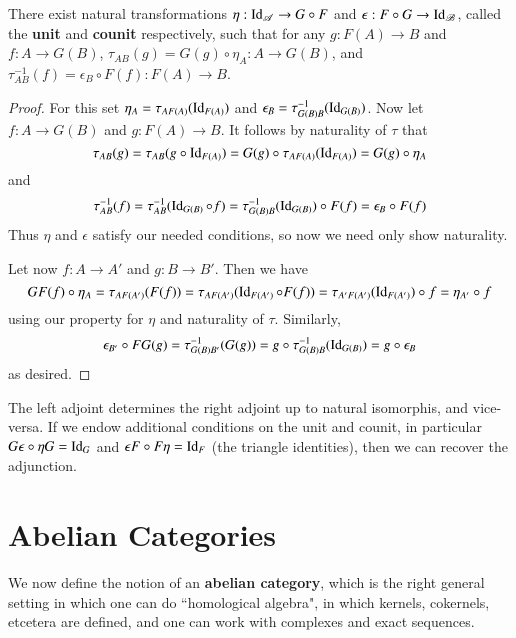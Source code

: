 \begin{proposition}
    There exist natural transformations $\eta:\operatorname{Id}_{\mathscr{A}}\rightarrow G\circ F$ and $\epsilon:F\circ G\rightarrow \operatorname{Id}_{\mathscr{B}}$, called the \textbf{unit} and \textbf{counit} respectively, such that for any $g:F(A)\rightarrow B$ and $f:A\rightarrow G(B)$, $\tau_{AB}(g) = G(g)\circ \eta_A:A\rightarrow G(B)$, and $\tau_{AB}^{-1}(f) = \epsilon_B\circ F(f):F(A)\rightarrow B$.
\end{proposition}
\begin{proof}
    For this set $\eta_A = \tau_{AF(A)}(\operatorname{Id}_{F(A)})$ and $\epsilon_B = \tau_{G(B)B}^{-1}(\operatorname{Id}_{G(B)})$. Now let $f:A\rightarrow G(B)$ and $g:F(A)\rightarrow B$. It follows by naturality of $\tau$ that \begin{equation*}
        \tau_{AB}(g) = \tau_{AB}(g\circ \operatorname{Id}_{F(A)}) = G(g)\circ\tau_{AF(A)}(\operatorname{Id}_{F(A)}) = G(g)\circ \eta_A
    \end{equation*}
    and \begin{equation*}
        \tau_{AB}^{-1}(f) = \tau_{AB}^{-1}(\operatorname{Id}_{G(B)}\circ f) = \tau^{-1}_{G(B)B}(\operatorname{Id}_{G(B)})\circ F(f) = \epsilon_B\circ F(f)
    \end{equation*}
    Thus $\eta$ and $\epsilon$ satisfy our needed conditions, so now we need only show naturality.

    Let now $f:A\rightarrow A'$ and $g:B\rightarrow B'$. Then we have $$GF(f)\circ \eta_A = \tau_{AF(A')}(F(f)) = \tau_{AF(A')}(\operatorname{Id}_{F(A')}\circ F(f)) = \tau_{A'F(A')}(\operatorname{Id}_{F(A')})\circ f = \eta_{A'}\circ f$$
    using our property for $\eta$ and naturality of $\tau$. Similarly, $$\epsilon_{B'}\circ FG(g) = \tau_{G(B)B'}^{-1}(G(g)) = g\circ \tau^{-1}_{G(B)B}(\operatorname{Id}_{G(B)}) = g\circ \epsilon_B$$
    as desired.
\end{proof}

The left adjoint determines the right adjoint up to natural isomorphis, and vice-versa. If we endow additional conditions on the unit and counit, in particular $G\epsilon\circ \eta G = \operatorname{Id}_G$ and $\epsilon F\circ F\eta = \operatorname{Id}_F$ (the triangle identities), then we can recover the adjunction.


\section{Abelian Categories}

We now define the notion of an \textbf{abelian category}, which is the right general setting in which one can do ``homological algebra", in which kernels, cokernels, etcetera are defined, and one can work with complexes and exact sequences.

